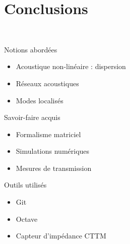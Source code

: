 \documentclass[12pt,xcolor=x11names,compress, notes=show]{beamer}%
\begin{document}
\section*{Conclusions}
\begin{frame}{~}
\insertsectionhead
	\begin{block}{Notions abordées}
		\centering
		\begin{itemize}
			\item Acoustique non-linéaire : dispersion
			\item Réseaux acoustiques
			\item Modes localisés
		\end{itemize}
	\end{block}
	
	\begin{exampleblock}{Savoir-faire acquis}
		\begin{itemize}
			\item Formalisme matriciel
			\item Simulations numériques
			\item Mesures de transmission
		\end{itemize}
	\end{exampleblock}
	
	\begin{alertblock}{Outils utilisés}
		\begin{itemize}
			\item Git
			\item Octave
			\item Capteur d'impédance CTTM
		\end{itemize}
	\end{alertblock}
	
\end{frame}
\end{document}
